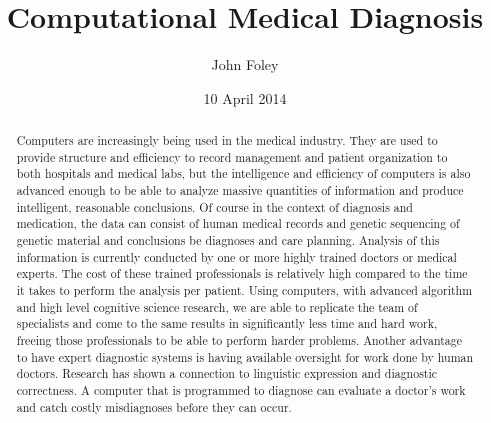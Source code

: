 \documentclass[11pt]{article}
\title{Computational Medical Diagnosis}
\author{John Foley}
\date{10 April 2014}
\begin{document}
\maketitle

\thispagestyle{empty}

\begin{abstract}
  Computers are increasingly being used in the medical industry. They are used to provide structure and efficiency to record 
  management and patient organization to both hospitals and medical labs, but the intelligence and efficiency of computers
  is also advanced enough to be able to analyze massive quantities of information and produce intelligent, reasonable
  conclusions. Of course in the context of diagnosis and medication, the data can consist of human medical records and
  genetic sequencing of genetic material and conclusions be diagnoses and care planning. Analysis of this information is
  currently conducted by one or more highly trained doctors or medical experts. The cost of these trained professionals
  is relatively high compared to the time it takes to perform the analysis per patient. Using computers, with advanced
  algorithm and high level cognitive science research, we are able to replicate the team of specialists and come to the same
  results in significantly less time and hard work, freeing those professionals to be able to perform harder problems. Another
  advantage to have expert diagnostic systems is having available oversight for work done by human doctors. Research has shown
  a connection to linguistic expression and diagnostic correctness. A computer that is programmed to diagnose can evaluate
  a doctor's work and catch costly misdiagnoses before they can occur.  
\end{abstract}

\pagebreak
\end{document}
